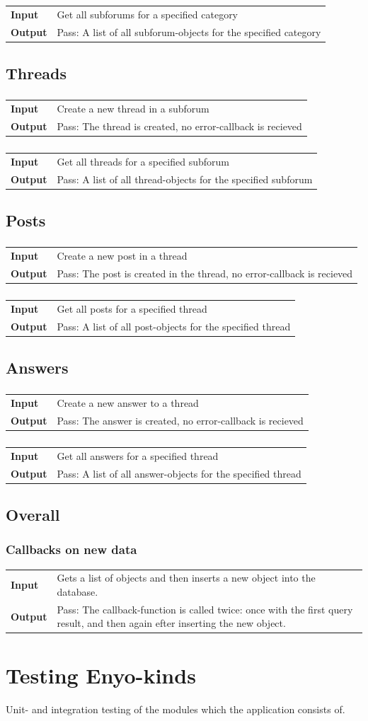 \documentclass[a4paper, 12pt, titlepage]{article}
\newcommand{\testcase}[2]{
	\subsubsection{}
	\begin{tabular}{l p{11cm}}
	\bf{Input} & 
		#1\\
	\bf{Output} & 
		#2\\
	\end{tabular}
}
\newcommand{\ttestcase}[3]{
	\subsubsection{#1}
	\begin{tabular}{l p{11cm}}
	\bf{Input} & 
		#2\\
	\bf{Output} & 
		#3\\
	\end{tabular}
}
\begin{document}
		\testcase
		{
			Get all subforums for a specified category
		}{
			Pass: A list of all subforum-objects for the specified category
		}

	\subsection{Threads}

		\testcase
		{
			Create a new thread in a subforum
		}{
			Pass: The thread is created, no error-callback is recieved
		}

		\testcase
		{
			Get all threads for a specified subforum
		}{
			Pass: A list of all thread-objects for the specified subforum
		}

	\subsection{Posts}

		\testcase
		{
			Create a new post in a thread
		}{
			Pass: The post is created in the thread, no error-callback is recieved
		}

		\testcase
		{
			Get all posts for a specified thread
		}{
			Pass: A list of all post-objects for the specified thread
		}

	\subsection{Answers}

		\testcase
		{
			Create a new answer to a thread
		}{
			Pass: The answer is created, no error-callback is recieved
		}

		\testcase
		{
			Get all answers for a specified thread
		}{
			Pass: A list of all answer-objects for the specified thread
		}


	\subsection{Overall}

		\ttestcase{Callbacks on new data}
		{
			Gets a list of objects and then inserts a new object into the database.
		}{
			Pass: The callback-function is called twice: once with the first query result, and then again efter inserting the new object.
		}

	\section{Testing Enyo-kinds}
	Unit- and integration testing of the modules which the application consists of.
\end{document}
